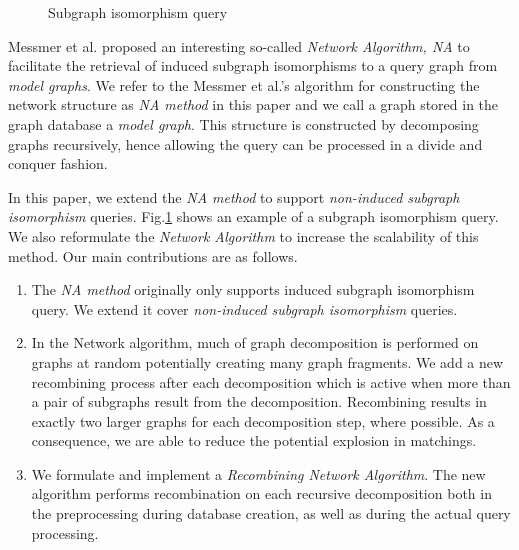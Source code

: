 

\begin{figure}
\centering

\caption{Subgraph isomorphism query}
\label{fig:fig11}
\end{figure}


Messmer et al.\cite{messmer_bunke2000_ieee_kde} proposed an interesting so-called \textit{Network Algorithm, NA} to facilitate the retrieval of induced subgraph isomorphisms 
to a query graph from \textit{model graphs}. We refer to the Messmer et al.'s algorithm for constructing the network structure as \textit{NA method} in this paper and we call a graph stored in the graph database a \textit{model graph}.
This structure is constructed by decomposing graphs recursively, hence allowing the query can be processed in a divide and conquer fashion.

In this paper, we extend the \textit{NA method} to support \textit{non-induced subgraph isomorphism} queries.
Fig.\ref{fig:fig11} shows an example of a subgraph isomorphism query. We also reformulate the \textit{Network Algorithm} to increase the scalability of this method.
Our main contributions are as follows.

\begin{enumerate}
\item The \textit{NA method} originally only supports induced subgraph isomorphism query. We extend it  cover \textit{non-induced subgraph isomorphism} queries.
\item  In the Network algorithm, much of graph decomposition is performed on graphs at random potentially creating many graph fragments. We add a new recombining process after each decomposition which is active when more than a pair of  subgraphs result from the decomposition.  Recombining results in exactly  two larger graphs for each decomposition step, where possible.  As a consequence, we are able to reduce the potential  explosion in matchings. 
\item We formulate and implement  a  \textit{Recombining  Network Algorithm}. The new algorithm performs recombination on  each recursive decomposition both in the  preprocessing during database creation, as well as during the actual query processing. 
\end{enumerate}


